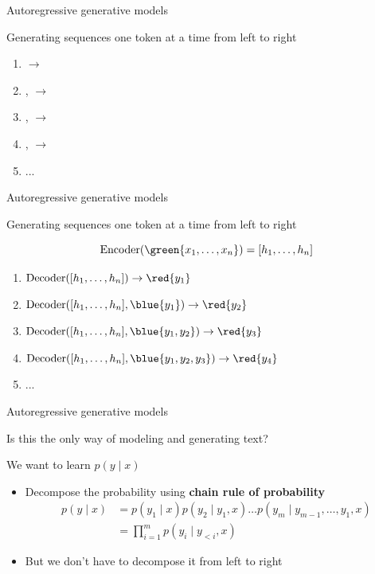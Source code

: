 \documentclass[usenames,dvipsnames,notes,11pt,aspectratio=169,hyperref={colorlinks=true, linkcolor=blue}]{beamer}
\begin{document}
\begin{frame}
    {Autoregressive generative models}

    Generating sequences one token at a time from left to right

    \begin{enumerate}
        \item {}
            $\to$ 
        \item {},
            $\to$ 
        \item {},
            $\to$ 
        \item {},
            $\to$ 
        \item ...
    \end{enumerate}

\end{frame}

\begin{frame}
    {Autoregressive generative models}

    Generating sequences one token at a time from left to right

    $$
    \mathrm{Encoder}(\green{x_1,\ldots,x_n}) = [h_1,\ldots,h_n]
    $$

    \begin{enumerate}
        \item $\mathrm{Decoder}([h_1,\ldots,h_n]) \to \red{y_1}$
        \item $\mathrm{Decoder}([h_1,\ldots,h_n], \blue{y_1}) \to \red{y_2}$
        \item $\mathrm{Decoder}([h_1,\ldots,h_n], \blue{y_1,y_2}) \to \red{y_3}$
        \item $\mathrm{Decoder}([h_1,\ldots,h_n], \blue{y_1,y_2,y_3}) \to \red{y_4}$
        \item ...
    \end{enumerate}
\end{frame}

\begin{frame}
    {Autoregressive generative models}

    Is this the only way of modeling and generating text?\pause

    We want to learn $p(y\mid x)$ \\
    \begin{itemize}
        \item Decompose the probability using \textbf{chain rule of probability} 
            \begin{align*}
                p(y\mid x) &= p(y_1\mid x)p(y_2\mid y_1, x)\ldots p(y_m\mid y_{m-1},\ldots,y_1, x) \\
                &= \prod_{i=1}^m p(y_i\mid y_{<i}, x)
            \end{align*}
        \item But we don't have to decompose it from left to right
    \end{itemize}
\end{frame}
\end{document}
